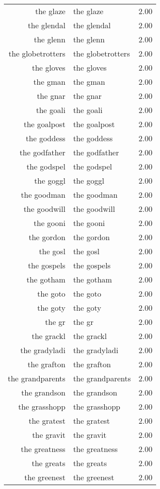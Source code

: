 \begin{table}[ht]
\begin{tabular}{rlr}
  the glaze & the glaze & 2.00 \\ 
  the glendal & the glendal & 2.00 \\ 
  the glenn & the glenn & 2.00 \\ 
  the globetrotters & the globetrotters & 2.00 \\ 
  the gloves & the gloves & 2.00 \\ 
  the gman & the gman & 2.00 \\ 
  the gnar & the gnar & 2.00 \\ 
  the goali & the goali & 2.00 \\ 
  the goalpost & the goalpost & 2.00 \\ 
  the goddess & the goddess & 2.00 \\ 
  the godfather & the godfather & 2.00 \\ 
  the godspel & the godspel & 2.00 \\ 
  the goggl & the goggl & 2.00 \\ 
  the goodman & the goodman & 2.00 \\ 
  the goodwill & the goodwill & 2.00 \\ 
  the gooni & the gooni & 2.00 \\ 
  the gordon & the gordon & 2.00 \\ 
  the gosl & the gosl & 2.00 \\ 
  the gospels & the gospels & 2.00 \\ 
  the gotham & the gotham & 2.00 \\ 
  the goto & the goto & 2.00 \\ 
  the goty & the goty & 2.00 \\ 
  the gr & the gr & 2.00 \\ 
  the grackl & the grackl & 2.00 \\ 
  the gradyladi & the gradyladi & 2.00 \\ 
  the grafton & the grafton & 2.00 \\ 
  the grandparents & the grandparents & 2.00 \\ 
  the grandson & the grandson & 2.00 \\ 
  the grasshopp & the grasshopp & 2.00 \\ 
  the gratest & the gratest & 2.00 \\ 
  the gravit & the gravit & 2.00 \\ 
  the greatness & the greatness & 2.00 \\ 
  the greats & the greats & 2.00 \\ 
  the greenest & the greenest & 2.00 \\ 

\end{tabular}
\end{table}
